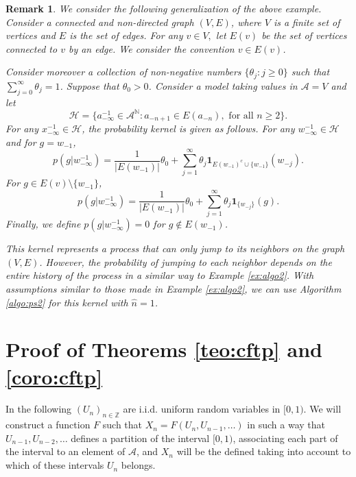 \documentclass[a4paper]{article}
\newtheorem{remark}{Remark}%
\newcommand{\Z}{\mathbb{Z}}
\newcommand{\N}{\mathbb{N}}
\renewcommand{\H}{\mathcal{H}}
\newcommand{\A}{\mathcal{A}}
\begin{document}
\begin{remark} \label{remark:examplealgo2}
We consider the following generalization of the above example. Consider a connected and non-directed graph $(V,E)$, where $V$ is a finite set of vertices and $E$ is the set of edges.  For any $v\in V,$ let $E(v)$ be the set of vertices connected to $v$ by an edge. We consider the convention $v \in E(v)$.

Consider moreover a collection of non-negative numbers $\{\theta_j:j\geq 0\}$  such that $\sum_{j=0}^{\infty}\theta_j=1$. Suppose that $\theta_0>0$. Consider a model taking values in $\A=V$ and let
$$
\H=\{a_{-\infty}^{-1}\in \A^{\N}:a_{-n+1}\in E(a_{-n}), \text{ for all } n \geq 2\}.
$$
For any $x_{-\infty}^{-1}\in \H$, the probability kernel is given as follows. For any $w_{-\infty}^{-1}\in \H$ and for $g=w_{-1}$,
$$
p(g|w_{-\infty}^{-1})= \frac{1}{|E(w_{-1})|}\theta_0 +\sum_{j=1}^{\infty}\theta_j
\mathbf{1}_{E(w_{-1})^c\cup\{w_{-1}\}}(w_{-j}).
$$
For $g\in E(v)\setminus \{w_{-1}\}$,
$$
p(g|w_{-\infty}^{-1})= \frac{1}{|E(w_{-1})|}\theta_0%
+\sum_{j=1}^{\infty}\theta_j\mathbf{1}_{\{w_{-j}\}}(g).
$$
Finally, we define $p(g|w_{-\infty}^{-1})=0$ for $g\not \in E(w_{-1})$. 

This kernel represents a process that can only jump to its neighbors on the graph $(V,E)$. However, the probability of jumping to each neighbor depends on the entire history of the process in a similar way to Example \ref{ex:algo2}. With assumptions similar to those made in Example \ref{ex:algo2}, we can use Algorithm \ref{algo:ps2} for this kernel with $\hat n =1$.
\end{remark}





\section{Proof of Theorems \ref{teo:cftp} and \ref{coro:cftp}} \label{sec:proofteocftp}

In the following $(U_n)_{n\in \Z}$ are i.i.d. uniform random variables in $[0,1)$. %
We will construct a function $F$ such that $X_n=F(U_n,U_{n-1}, \ldots)$ in such a way that $U_{n-1}, U_{n-2}, \ldots$ defines a partition of the interval $[0,1)$, associating each part of the interval to an element of $\A$, and $X_n$ will be the defined taking into account to which of these intervals $U_n$ belongs.
\end{document}
